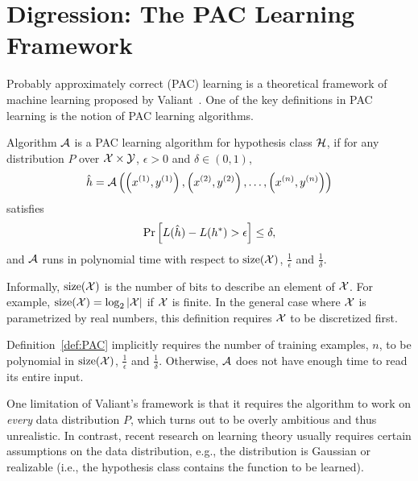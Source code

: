 \documentclass[11pt]{article}
\begin{document}
\section{Digression: The PAC Learning Framework}
	Probably approximately correct (PAC) learning is a theoretical framework of machine learning proposed by Valiant~\cite{valiant1984theory}. One of the key definitions in PAC learning is the notion of PAC learning algorithms.
	\begin{definition}\label{def:PAC}
		Algorithm $\mathcal{A}$ is a PAC learning algorithm for hypothesis class $\mathcal{H}$, if for any distribution $P$ over $\mathcal{X} \times \mathcal{Y}$, $\epsilon > 0$ and $\delta \in (0, 1)$,
			\[\hat h = \mathcal{A}\left(\left(x^{(1)}, y^{(1)}\right), \left(x^{(2)}, y^{(2)}\right), \ldots, \left(x^{(n)}, y^{(n)}\right)\right)\]
		satisfies
		\begin{equation*}
			\Pr_{}\left[L(\hat h) - L(h^*) > \epsilon\right] \le \delta,
		\end{equation*}
		and $\mathcal{A}$ runs in polynomial time with respect to $\mathrm{size}(\mathcal{X})$, $\frac{1}{\epsilon}$ and $\frac{1}{\delta}$.
	\end{definition}
	\begin{remark}
		Informally, $\mathrm{size}(\mathcal{X})$ is the number of bits to describe an element of $\mathcal{X}$. For example, $\mathrm{size}(\mathcal{X}) = \log_2|\mathcal{X}|$ if $\mathcal{X}$ is finite. In the general case where $\mathcal{X}$ is parametrized by real numbers, this definition requires $\mathcal{X}$ to be discretized first.
	\end{remark}
	\begin{remark}
		Definition~\ref{def:PAC} implicitly requires the number of training examples, $n$, to be polynomial in $\mathrm{size}(\mathcal{X})$, $\frac{1}{\epsilon}$ and $\frac{1}{\delta}$. Otherwise, $\mathcal{A}$ does not have enough time to read its entire input.
	\end{remark}

	One limitation of Valiant's framework is that it requires the algorithm to work on \emph{every} data distribution $P$, which turns out to be overly ambitious and thus unrealistic. In contrast, recent research on learning theory usually requires certain assumptions on the data distribution, e.g., the distribution is Gaussian or realizable (i.e., the hypothesis class contains the function to be learned).
\end{document}
